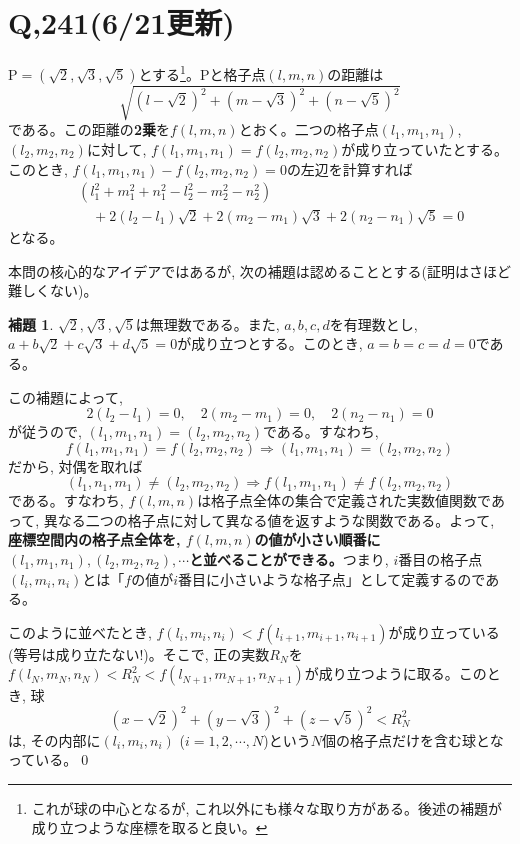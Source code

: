 \documentclass[twocolumn]{jbook}
\theoremstyle{definition}
\newtheorem{lem}[theo]{補題}
\newcommand{\beqn}{\begin{eqnarray*}}
\newcommand{\eeqn}{\end{eqnarray*}}
\newcommand{\nara}{\Rightarrow}
\newcommand{\mr}{\mathrm}
\begin{document}
\section*{Q,241(6/21更新)}
$\mr{P} = (\sqrt{2},\sqrt{3}, \sqrt{5})$とする\footnote{これが球の中心となるが, これ以外にも様々な取り方がある。後述の補題が成り立つような座標を取ると良い。}。$\mr{P}$と格子点$(l,m,n)$の距離は
\[\sqrt{(l-\sqrt{2})^2 + (m-\sqrt{3})^2 + (n-\sqrt{5})^2}\]
である。この距離の\textbf{2乗}を$f(l,m,n)$とおく。二つの格子点$(l_1,m_1,n_1)$, $(l_2,m_2,n_2)$に対して, $f(l_1,m_1,n_1) = f(l_2,m_2,n_2)$が成り立っていたとする。このとき, $f(l_1,m_1,n_1) - f(l_2,m_2,n_2) = 0$の左辺を計算すれば
\beqn
&&(l_1^2 + m_1^2 + n_1^2 - l_2^2 - m_2^2 - n_2^2) \\
&&\quad +2(l_2 - l_1)\sqrt{2}  + 2(m_2-m_1)\sqrt{3} + 2(n_2-n_1)\sqrt{5} = 0
\eeqn
となる。\par
本問の核心的なアイデアではあるが, 次の補題は認めることとする(証明はさほど難しくない)。
\begin{lem}
$\sqrt{2},\sqrt{3},\sqrt{5}$は無理数である。また, $a,b,c,d$を有理数とし, $a+b\sqrt{2} + c\sqrt{3} + d\sqrt{5} = 0$が成り立つとする。このとき, $a=b=c=d=0$である。
\end{lem}
この補題によって, 
\[2(l_2 - l_1) = 0,\quad  2(m_2-m_1) = 0,\quad 2(n_2-n_1) = 0\]
が従うので, $(l_1,m_1,n_1) = (l_2,m_2,n_2)$である。すなわち,
\[f(l_1,m_1,n_1) = f(l_2,m_2,n_2) \nara (l_1,m_1,n_1) = (l_2,m_2,n_2)\]
だから, 対偶を取れば
\[(l_1,n_1,m_1)\neq (l_2,m_2,n_2) \nara f(l_1,m_1,n_1) \neq f(l_2,m_2,n_2)\]
である。すなわち, $f(l,m,n)$は格子点全体の集合で定義された実数値関数であって, 異なる二つの格子点に対して異なる値を返すような関数である。よって, \textbf{座標空間内の格子点全体を, $f(l,m,n)$の値が小さい順番に$(l_1,m_1,n_1), (l_2,m_2,n_2),\cdots$と並べることができる。}つまり, $i$番目の格子点$(l_i,m_i,n_i)$とは「$f$の値が$i$番目に小さいような格子点」として定義するのである。\par
このように並べたとき, $f(l_i,m_i,n_i) < f(l_{i+1},m_{i+1},n_{i+1})$が成り立っている(等号は成り立たない!)。そこで, 正の実数$R_N$を$f(l_N,m_N,n_N) < R_N^2 < f(l_{N+1},m_{N+1},n_{N+1})$が成り立つように取る。このとき, 球
\[(x-\sqrt{2})^2 + (y-\sqrt{3})^2 + (z-\sqrt{5})^2 < R_N^2\]
は, その内部に$(l_i,m_i,n_i)$ ($i=1,2,\cdots, N$)という$N$個の格子点だけを含む球となっている。\qed
\end{document}
